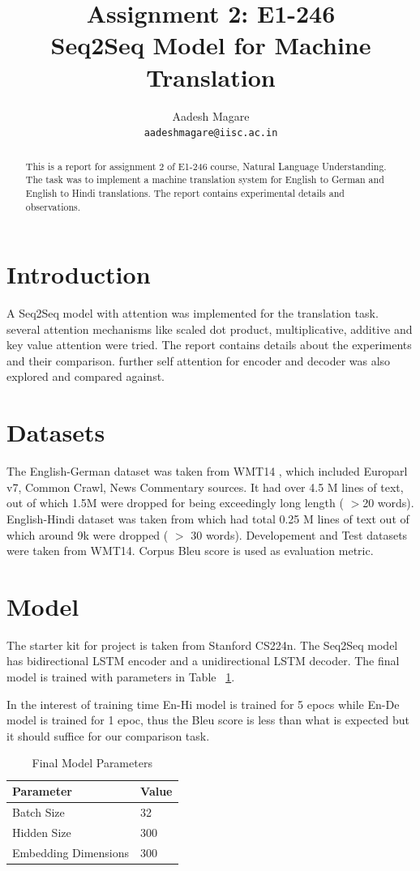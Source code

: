 \documentclass[11pt,a4paper]{article}
\title{Assignment 2: E1-246 \\
Seq2Seq Model for Machine Translation}
\author{Aadesh Magare \\
  \texttt{aadeshmagare@iisc.ac.in} \\}
\date{}
\begin{document}
\maketitle
\begin{abstract}
  This is a report for assignment 2 of E1-246 course, Natural Language Understanding. The task was to implement a machine translation system for English to German and English to Hindi translations. The report contains experimental details and observations.
\end{abstract}

\section{Introduction}

A Seq2Seq model with attention was implemented for the translation task.
several attention mechanisms like scaled dot product, multiplicative, additive and key value attention were tried. The report contains details about the experiments and their comparison. further self attention for encoder and decoder was also explored and compared against.

\section{Datasets}
The English-German dataset was taken from WMT14 \cite{WMT}, which included Europarl v7, Common Crawl, News Commentary sources. It had over 4.5 M lines of text, out of which 1.5M were dropped for being exceedingly long length ( $>$20 words).
English-Hindi dataset was taken from \cite{ufal} which had total 0.25 M lines of text out of which around 9k were dropped ( $>$ 30 words). 
Developement and Test datasets were taken from WMT14. Corpus Bleu score is used as evaluation metric.

\section{Model}
The starter kit for project is taken from Stanford CS224n. \cite{cs224n} The Seq2Seq model has bidirectional LSTM encoder and a unidirectional LSTM decoder. The final model is trained with parameters in Table ~\ref{table1}.

In the interest of training time En-Hi model is trained for 5 epocs while En-De model is trained for 1 epoc, thus the Bleu score is less than what is expected but it should suffice for our comparison task.

\begin{table}[h]
\centering
\begin{tabular}{|l|l|}
\hline
\textbf{Parameter} & \textbf{Value} \\ \hline
Batch Size  & 32                          \\ \hline
Hidden Size  & 300                         \\ \hline
Embedding Dimensions & 300                         \\ \hline
\end{tabular}
\caption{Final Model Parameters}
\label{table1}
\end{table}
\end{document}
